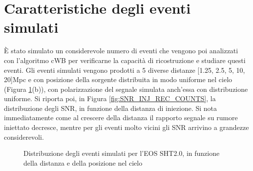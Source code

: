 \section{Caratteristiche degli eventi simulati}
\label{subsection:cwb_injections}
È stato simulato un considerevole numero di eventi che vengono poi analizzati con l'algoritmo cWB per verificarne la capacità di ricostruzione e studiare questi eventi. 
Gli eventi simulati vengono prodotti a 5 diverse distanze [1.25, 2.5, 5, 10, 20]Mpc e con posizione della sorgente distribuita in modo uniforme nel cielo (Figura \ref{fig:skypos}(b)), con polarizzazione del segnale simulata anch'essa con distribuzione uniforme.
Si riporta poi, in Figura \ref{fig:SNR_INJ_REC_COUNTS}, la distribuzione degli SNR, in funzione della distanza di iniezione. Si nota immediatamente come al crescere della distanza il rapporto segnale su rumore iniettato decresce, mentre per gli eventi molto vicini gli SNR arrivino a grandezze considerevoli. \\
\begin{figure}[hbt!]
	\vspace{-5pt}
	\centering
	\quad
	\caption{Distribuzione degli eventi simulati per l'EOS SHT2.0, in funzione della distanza e della posizione nel cielo}
	\label{fig:skypos}
	\vspace{-5pt}
\end{figure}
